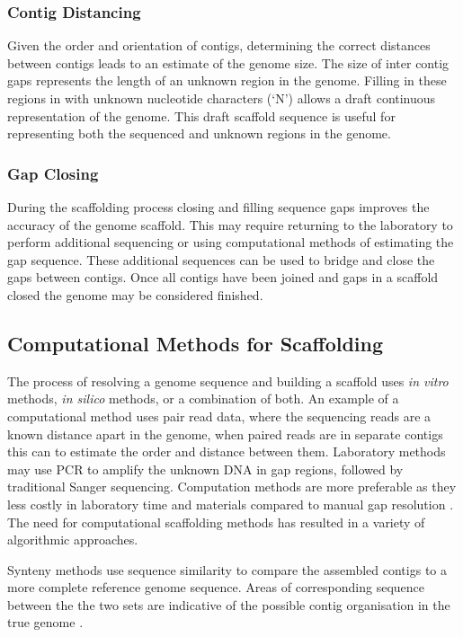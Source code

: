 \documentclass[10pt]{bmc_article}
\newenvironment{bmcformat}{\begin{raggedright}\baselineskip20pt\sloppy\setboolean{publ}{false}}{\end{raggedright}\baselineskip20pt\sloppy}
\begin{document}
\begin{bmcformat}
\subsubsection*{Contig Distancing} %

Given the order and orientation of contigs, determining the correct distances
between contigs leads to an estimate of the genome size. The size of inter
contig gaps represents the length of an unknown region in the genome. Filling
in these regions in with unknown nucleotide characters (`N') allows a draft
continuous representation of the genome. This draft scaffold sequence is
useful for representing both the sequenced and unknown regions in the genome.

\subsubsection*{Gap Closing} %

During the scaffolding process closing and filling sequence gaps improves the
accuracy of the genome scaffold. This may require returning to the laboratory
to perform additional sequencing or using computational methods of estimating
the gap sequence. These additional sequences can be used to bridge and close
the gaps between contigs. Once all contigs have been joined and gaps in
a scaffold closed the genome may be considered finished.

\subsection*{Computational Methods for Scaffolding} %

The process of resolving a genome sequence and building a scaffold uses
\emph{in vitro} methods, \emph{in silico} methods, or a combination of both.
An example of a computational method uses pair read data, where the sequencing
reads are a known distance apart in the genome, when paired reads are in
separate contigs this can to estimate the order and distance between them.
Laboratory methods may use PCR to amplify the unknown DNA in gap regions,
followed by traditional Sanger sequencing. Computation methods are more
preferable as they less costly in laboratory time and materials compared to
manual gap resolution \cite{nagarajan2010}. The need for computational
scaffolding methods has resulted in a variety of algorithmic approaches. \pb

Synteny methods use sequence similarity to compare the assembled contigs to
a more complete reference genome sequence. Areas of corresponding sequence
between the the two sets are indicative of the possible contig organisation in
the true genome \cite{richter2007,zhao2008}. \pb


\end{bmcformat}
\end{document}
